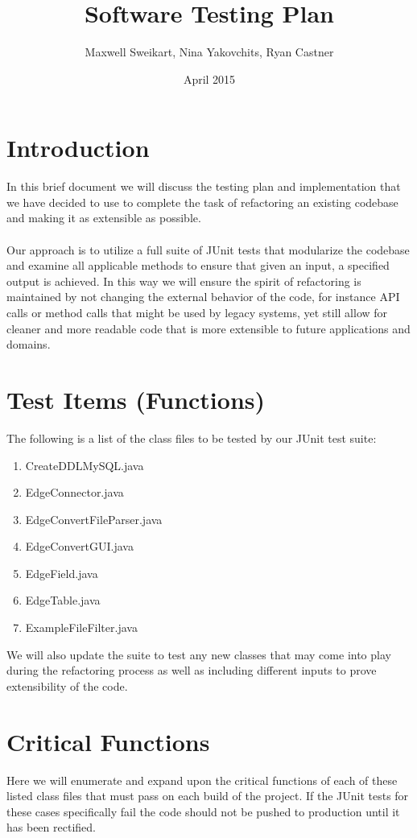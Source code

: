 \documentclass{article}
\title{Software Testing Plan}
\author{Maxwell Sweikart, Nina Yakovchits, Ryan Castner}
\date{April 2015}
\begin{document}
\maketitle

\section{Introduction}
In this brief document we will discuss the testing plan and implementation that we have decided to use to complete the task of refactoring an existing codebase and making it as extensible as possible.
\hfill \\
\\ Our approach is to utilize a full suite of JUnit tests that modularize the codebase and examine all applicable methods to ensure that given an input, a specified output is achieved. In this way we will ensure the spirit of refactoring is maintained by not changing the external behavior of the code, for instance API calls or method calls that might be used by legacy systems, yet still allow for cleaner and more readable code that is more extensible to future applications and domains.

\section{Test Items (Functions)}
The following is a list of the class files to be tested by our JUnit test suite: \hfill \\
\begin{enumerate}
\item CreateDDLMySQL.java
\item EdgeConnector.java
\item EdgeConvertFileParser.java
\item EdgeConvertGUI.java
\item EdgeField.java
\item EdgeTable.java
\item ExampleFileFilter.java
\end{enumerate}

We will also update the suite to test any new classes that may come into play during the refactoring process as well as including different inputs to prove extensibility of the code.

\section{Critical Functions}
Here we will enumerate and expand upon the critical functions of each of these listed class files that must pass on each build of the project. If the JUnit tests for these cases specifically fail the code should not be pushed to production until it has been rectified. \hfill \\
\end{document}
